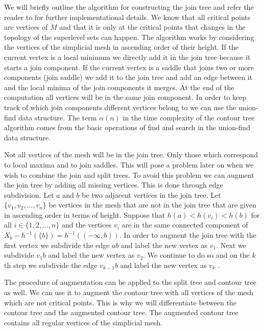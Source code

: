 We will briefly outline the algorithm for constructing the join tree and refer the reader to \cite{ct-big-paper} for further implementational details. We know that all critical points are vertices of $M$ and that it is only at the critical points that changes in the topology of the superlevel sets can happen. The algorithm works by considering the vertices of the simplicial mesh in ascending order of their height. If the current vertex is a local minimum we directly add it in the join tree because it starts a join component. If the current vertex is a saddle that joins two or more components (join saddle) we add it to the join tree and add an edge between it and the local minima of the join components it merges. At the end of the computation all vertices will be in the same join component. In order to keep track of which join components different vertices belong to we can use the union-find data structure. The term  $\alpha(n)$ in the time complexity of the contour tree algorithm comes from the basic operations of find and search in the union-find data structure.

Not all vertices of the mesh will be in the join tree. Only those which correspond to local maxima and to join saddles. This will pose a problem later on when we wish to combine the join and split trees. To avoid this problem we can augment the join tree by adding all missing vertices. This is done through edge subdivision. Let $a \text{ and } b$ be two adjacent vertices in the join tree.  Let $\{v_1, v_2, ..., v_n\}$ be vertices in the mesh that are not in the join tree that are given in ascending order in terms of height.  Suppose that $h(a) < h(v_i) < h(b)$ for all $i \in \{1, 2, ..., n\}$ and the vertices $v_i$ are in the same connected component of $X_b - h^{-1}(\{b\}) = h^{-1}((-\infty, b))$. In order to augment the join tree with the first vertex we subdivide the edge $ab$ and label the new vertex as $v_1$. Next we subdivide $v_1b$ and label the new vertex as $v_2$. We continue to do so and on the $k$th step we subdivide the edge
$ v_{k-1}b $ and label the new vertex as $v_k$  .

The procedure of augmentation can be applied to the split tree and contour tree as well. We can use it to augment the contour tree with all vertices of the mesh which are not critical points. This is why we will differentiate between the contour tree and the augmented contour tree. The augmented contour tree contains all regular vertices of the simplicial mesh.

